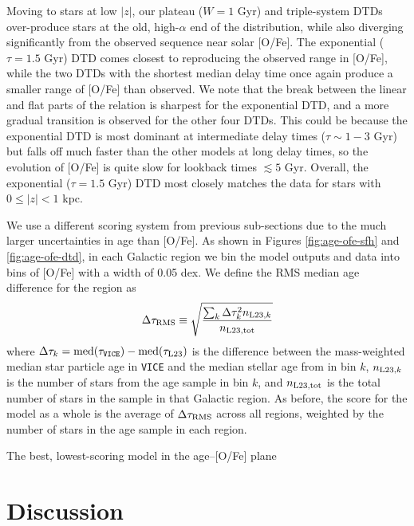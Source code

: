 \documentclass[twocolumn,twocolappendix,linenumbers,trackchanges]{aastex631}
\newcommand{\vice}{{\tt VICE}\xspace}
\begin{document}
Moving to stars at low $|z|$, our plateau ($W=1$ Gyr) and triple-system DTDs over-produce stars at the old, high-$\alpha$ end of the distribution, while also diverging significantly from the observed sequence near solar [O/Fe]. The exponential ($\tau=1.5$ Gyr) DTD comes closest to reproducing the observed range in [O/Fe], while the two DTDs with the shortest median delay time once again produce a smaller range of [O/Fe] than observed. We note that the break between the linear and flat parts of the relation is sharpest for the exponential DTD, and a more gradual transition is observed for the other four DTDs. This could be because the exponential DTD is most dominant at intermediate delay times ($\tau\sim 1-3$ Gyr) but falls off much faster than the other models at long delay times, so the evolution of [O/Fe] is quite slow for lookback times $\lesssim 5$ Gyr. Overall, the exponential ($\tau=1.5$ Gyr) DTD most closely matches the data for stars with $0\leq|z|<1$ kpc.

We use a different scoring system from previous sub-sections due to the much larger uncertainties in age than [O/Fe]. As shown in Figures \ref{fig:age-ofe-sfh} and \ref{fig:age-ofe-dtd}, in each Galactic region we bin the model outputs and data into bins of [O/Fe] with a width of 0.05 dex. We define the RMS median age difference for the region as
\begin{equation}
    \Delta\tau_{\rm RMS} \equiv \sqrt{\frac{\sum_k \Delta\tau_k^2 n_{{\rm L23},k}}{n_{\rm L23,tot}}}
    \label{eq:age-ofe-score}
\end{equation}
where $\Delta\tau_k=\rm{med}(\tau_{\rm \vice})-\rm{med}(\tau_{\rm L23})$ is the difference between the mass-weighted median star particle age in \vice and the median stellar age from  in bin $k$, $n_{{\rm L23},k}$ is the number of stars from the  age sample in bin $k$, and $n_{\rm L23,tot}$ is the total number of stars in the sample in that Galactic region. As before, the score for the model as a whole is the average of $\Delta \tau_{\rm RMS}$ across all regions, weighted by the number of stars in the age sample in each region.

The best, lowest-scoring model in the age--[O/Fe] plane 

\section{Discussion}
\label{sec:discussion}

\end{document}

